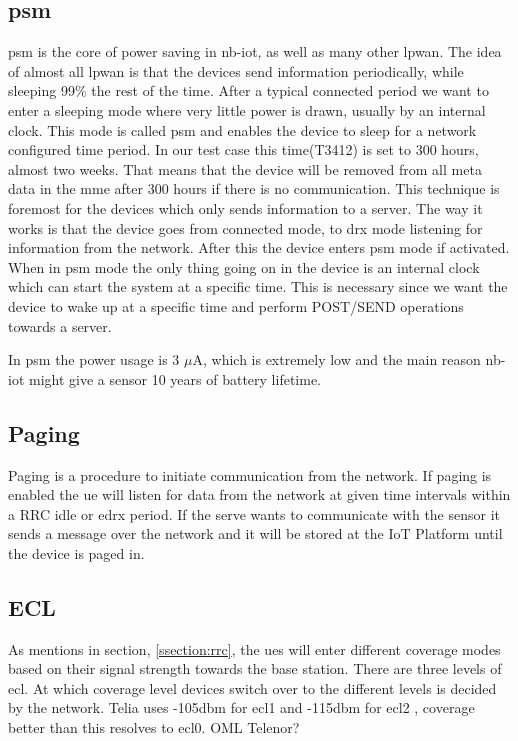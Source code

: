 \documentclass[USenglish]{ifimaster}  %
\begin{document}
\subsection{\acrfull{psm}} \label{ssection:psm}
\acrshort{psm} is the core of power saving in \acrshort{nb-iot}, as well as many other \acrshort{lpwan}. The idea of almost all \acrshort{lpwan} is that the devices send information periodically, while sleeping 99\% the rest of the time. After a typical connected period we want to enter a sleeping mode where very little power is drawn, usually by an internal clock. This mode is called \acrshort{psm} and enables the device to sleep for a network configured time period. In our test case this time(\acrfull{T3412}) is set to 300 hours, almost two weeks. That means that the device will be removed from all meta data in the \acrshort{mme} after 300 hours if there is no communication. This technique is foremost for the devices which only sends information to a server. The way it works is that the device goes from connected mode, to \acrshort{drx} mode listening for information from the network. After this the device enters \acrshort{psm} mode if activated. When in \acrshort{psm} mode the only thing going on in the device is an internal clock which can start the system at a specific time. This is necessary since we want the device to wake up at a specific time and perform POST/SEND operations towards a server.

In \acrshort{psm} the power usage is 3 $\mu$A, which is extremely low and the main reason \acrshort{nb-iot} might give a sensor 10 years of battery lifetime.

\subsection{Paging} \label{ssection:paging}
Paging is a procedure to initiate communication from the network. If paging is enabled the \acrshort{ue} will listen for data from the network at given time intervals within a RRC idle or \acrshort{edrx} period. If the serve wants to communicate with the sensor it sends a message over the network and it will be stored at the IoT Platform until the device is paged in.

\subsection{ECL} \label{ssection:ecl}
As mentions in section, \vref{ssection:rrc}, the \acrshort{ue}s will enter different coverage modes based on their signal strength towards the base station. There are three levels of \acrfull{ecl}. At which coverage level devices switch over to the different levels is decided by the network. Telia uses -105\acrshort{dbm} for \acrshort{ecl}1 and -115\acrshort{dbm} for \acrshort{ecl}2 \cite{mail:teliaMailThread}, coverage better than this resolves to \acrshort{ecl}0. OML Telenor?
\end{document}
